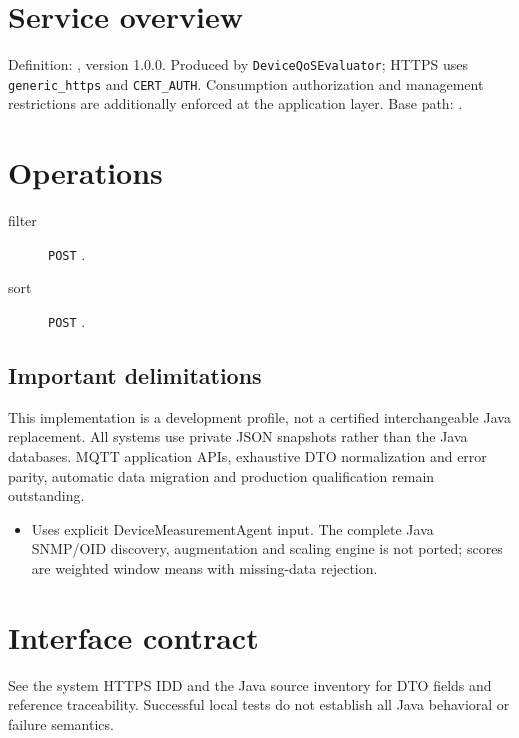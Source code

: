 \documentclass[a4paper]{arrowhead}
\begin{document}
\ArrowheadSetup
\section{Service overview}
Definition: , version 1.0.0. Produced by \texttt{DeviceQoSEvaluator}; HTTPS uses \texttt{generic\_https} and \texttt{CERT\_AUTH}. Consumption authorization and management restrictions are additionally enforced at the application layer. Base path: .
\section{Operations}
\begin{description}
\item[filter] \texttt{POST} .
\item[sort] \texttt{POST} .
\end{description}
\subsection{Important delimitations}
This implementation is a development profile, not a certified interchangeable Java replacement. All systems use private JSON snapshots rather than the Java databases. MQTT application APIs, exhaustive DTO normalization and error parity, automatic data migration and production qualification remain outstanding.
\begin{itemize}
\item Uses explicit DeviceMeasurementAgent input. The complete Java SNMP/OID discovery, augmentation and scaling engine is not ported; scores are weighted window means with missing-data rejection.
\end{itemize}
\section{Interface contract}
See the system HTTPS IDD and the Java source inventory for DTO fields and reference traceability. Successful local tests do not establish all Java behavioral or failure semantics.
\end{document}
